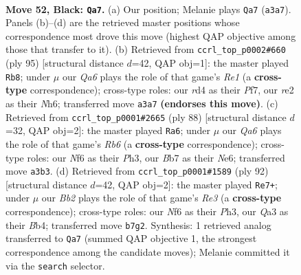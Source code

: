 \documentclass[11pt]{article}
\begin{document}
\clearpage

\begin{figure}[p]\centering
\begin{subfigure}{0.46\textwidth}\centering
\resizebox{\linewidth}{!}{%
\newchessgame
\chessboard[
  setfen={8/1b3pk1/5np1/8/3R3P/q7/4RK1P/5N2 b - - 12 52},
  showmover=false,
  pgfstyle=straightmove, color=movearrow, markmove={a3-a7}
]}
\caption{}
\end{subfigure}\hfill
\begin{subfigure}{0.46\textwidth}\centering
\resizebox{\linewidth}{!}{%
\newchessgame
\chessboard[
  setfen={4r3/5ppk/7n/R6P/7P/6NK/5P2/8 b - - 6 48},
  showmover=false,
  pgfstyle=straightmove, color=movearrow, markmove={e8-b8}
]}
\caption{}
\end{subfigure}
\\[4pt]
\begin{subfigure}{0.46\textwidth}\centering
\resizebox{\linewidth}{!}{%
\newchessgame
\chessboard[
  setfen={6n1/8/1R2N1pk/p6p/r7/7P/6PK/8 w - - 4 45},
  showmover=false,
  pgfstyle=straightmove, color=movearrow, markmove={b6-a6}
]}
\caption{}
\end{subfigure}\hfill
\begin{subfigure}{0.46\textwidth}\centering
\resizebox{\linewidth}{!}{%
\newchessgame
\chessboard[
  setfen={8/3k4/pnr3p1/7p/1B6/4R2P/1P4P1/1K6 w - - 2 47},
  showmover=false,
  pgfstyle=straightmove, color=movearrow, markmove={e3-e7}
]}
\caption{}
\end{subfigure}
\caption{\textbf{Move 52, Black: \texttt{Qa7}.} (a) Our position; Melanie plays \texttt{Qa7} (\texttt{a3a7}). Panels (b)--(d) are the retrieved master positions whose correspondence most drove this move (highest QAP objective among those that transfer to it). (b) Retrieved from \texttt{ccrl\_top\_p0002\#660} (ply 95) [structural distance $d$=42, QAP obj=1]: the master played \texttt{Rb8}; under $\mu$ our \emph{Qa6} plays the role of that game's \emph{Re1} (a \textbf{cross-type} correspondence); cross-type roles: our \emph{r}d4 as their \emph{P}f7, our \emph{r}e2 as their \emph{N}h6; transferred move \texttt{a3a7} \textbf{(endorses this move)}. (c) Retrieved from \texttt{ccrl\_top\_p0001\#2665} (ply 88) [structural distance $d$=32, QAP obj=2]: the master played \texttt{Ra6}; under $\mu$ our \emph{Qa6} plays the role of that game's \emph{Rb6} (a \textbf{cross-type} correspondence); cross-type roles: our \emph{N}f6 as their \emph{P}h3, our \emph{B}b7 as their \emph{N}e6; transferred move \texttt{a3b3}. (d) Retrieved from \texttt{ccrl\_top\_p0001\#1589} (ply 92) [structural distance $d$=42, QAP obj=2]: the master played \texttt{Re7+}; under $\mu$ our \emph{Bb2} plays the role of that game's \emph{Re3} (a \textbf{cross-type} correspondence); cross-type roles: our \emph{N}f6 as their \emph{P}h3, our \emph{Q}a3 as their \emph{B}b4; transferred move \texttt{b7g2}. Synthesis: 1 retrieved analog transferred to \texttt{Qa7} (summed QAP objective 1, the strongest correspondence among the candidate moves); Melanie committed it via the \texttt{search} selector.}
\label{fig:thought-m103}
\end{figure}
\end{document}
